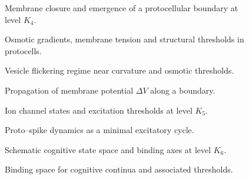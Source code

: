 \begin{figure}[p]
  \centering
  
  \caption{Membrane closure and emergence of a protocellular boundary
           at level \texorpdfstring{\(K_4\)}{K_4}.}
  \label{fig:membrane-closure}
\end{figure}

\begin{figure}[p]
  \centering
  
  \caption{Osmotic gradients, membrane tension and structural thresholds
           in protocells.}
  \label{fig:gradient-osmosis-tension}
\end{figure}

\begin{figure}[p]
  \centering
  
  \caption{Vesicle flickering regime near curvature and osmotic thresholds.}
  \label{fig:vesicle-flickering}
\end{figure}

\begin{figure}[p]
  \centering
  
  \caption{Propagation of membrane potential \texorpdfstring{\(\Delta V\)}{\Delta V} along a boundary.}
  \label{fig:dv-propagation-membrane}
\end{figure}

\begin{figure}[p]
  \centering
  
  \caption{Ion channel states and excitation thresholds at level \texorpdfstring{\(K_5\)}{K_5}.}
  \label{fig:ion-channel-states}
\end{figure}

\begin{figure}[p]
  \centering
  
  \caption{Proto--spike dynamics as a minimal excitatory cycle.}
  \label{fig:proto-spike}
\end{figure}

\begin{figure}[p]
  \centering
  
  \caption{Schematic cognitive state space and binding axes at level \texorpdfstring{\(K_6\)}{K_6}.}
  \label{fig:cognitive-state-space}
\end{figure}

\begin{figure}[p]
  \centering
  
  \caption{Binding space for cognitive continua and associated thresholds.}
  \label{fig:binding-space}
\end{figure}

